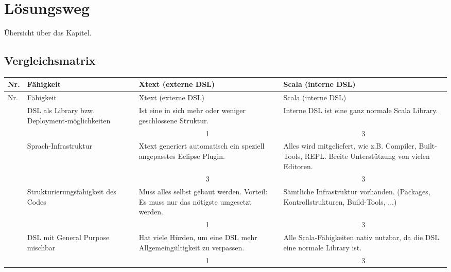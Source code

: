 \chapter{Lösungsweg}

Übersicht über das Kapitel.

\section{Vergleichsmatrix}

\begin{longtable}{|p{0.5cm}|p{4.5cm}|p{6.5cm}|p{6.5cm}|}

  \hline
  Nr. & Fähigkeit & Xtext (externe DSL) & Scala (interne DSL) \\ \hline \hline
  \endfirsthead

  \hline
  Nr. & Fähigkeit & Xtext (externe DSL) & Scala (interne DSL) \\ \hline
  \endhead

  & DSL als Library bzw. Deployment-möglichkeiten
  & Ist eine in sich mehr oder weniger geschlossene Struktur.
  & Interne DSL ist eine ganz normale Scala Library.
  \\
  \cline{3-4}
  & & \multicolumn{1}{c|}{ 1 } & \multicolumn{1}{c|}{ 3 } \\ \hline

  & Sprach-Infrastruktur
  & Xtext generiert automatisch ein speziell angepasstes Eclipse Plugin.
  & Alles wird mitgeliefert, wie z.B. Compiler, Built-Tools, REPL.
    Breite Unterstützung von vielen Editoren.
  \\
  \cline{3-4}
  & & \multicolumn{1}{c|}{ 3 } & \multicolumn{1}{c|}{ 3 } \\ \hline

  & Strukturierungsfähigkeit des Codes
  & Muss alles selbst gebaut werden. Vorteil: Es muss nur das nötigste
    umgesetzt werden.
  & Sämtliche Infrastruktur vorhanden. (Packages, Kontrollstrukturen,
    Build-Tools, ...)
  \\
  \cline{3-4}
  & & \multicolumn{1}{c|}{ 1 } & \multicolumn{1}{c|}{ 3 } \\ \hline

  & DSL mit General Purpose mischbar
  & Hat viele Hürden, um eine DSL mehr Allgemeingültigkeit zu verpassen.
  & Alle Scala-Fähigkeiten nativ nutzbar, da die DSL eine normale Library ist.
  \\
  \cline{3-4}
  & & \multicolumn{1}{c|}{ 1 } & \multicolumn{1}{c|}{ 3 } \\ \hline


\end{longtable}
